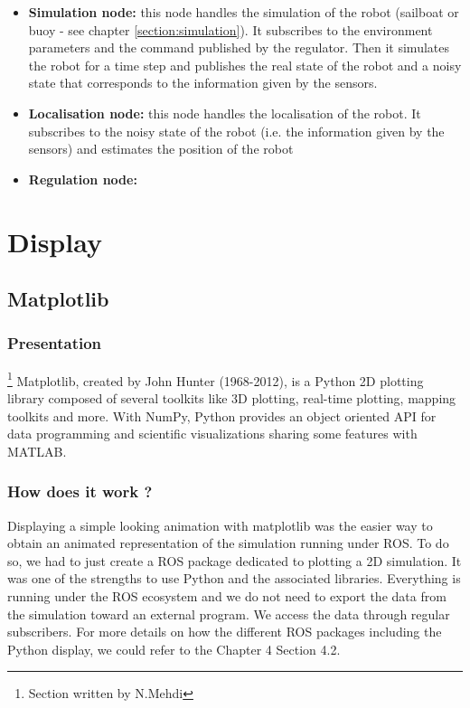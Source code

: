 \documentclass[a4paper]{report}
\begin{document}
    \begin{itemize}
    \item \textbf{Simulation node:} this node handles the simulation of the robot (sailboat or buoy - see chapter \ref{section:simulation}). It subscribes to the environment parameters and the command published by the regulator. Then it simulates the robot for a time step and publishes the real state of the robot and a noisy state that corresponds to the information given by the sensors.
    \item \textbf{Localisation node:} this node handles the localisation of the robot. It subscribes to the noisy state of the robot (i.e. the information given by the sensors) and estimates the position of the robot
    \item \textbf{Regulation node:}
    \end{itemize}
\chapter{Display}

\section{Matplotlib}

\subsection{Presentation}
\footnote{Section written by N.Mehdi } 
Matplotlib, created by John Hunter (1968-2012), is a Python 2D plotting library composed of several toolkits like 3D plotting, real-time plotting, mapping toolkits and more. With NumPy, Python provides an object oriented API for data programming and scientific visualizations sharing some features with MATLAB.

\subsection{How does it work ?}

Displaying a simple looking animation with matplotlib was the easier way to obtain an animated representation of the simulation running under ROS. To do so, we had to just create a ROS package dedicated to plotting a 2D simulation. It was one of the strengths to use Python and the associated libraries. Everything is running under the ROS ecosystem and we do not need to export the data from the simulation toward an external program. We access the data through regular subscribers.
For more details on how the different ROS packages including the Python display, we could refer to the Chapter 4 Section 4.2. 
\end{document}

